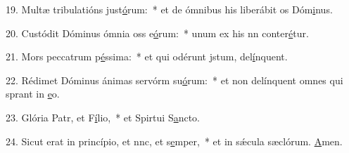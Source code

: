 19. Multæ tribulatións just\uline{ó}rum:~* et de ómnibus his liberábit os Dóm\uline{i}nus.\par 
20. Custódit Dóminus ómnia oss e\uline{ó}rum:~* unum ex his nn conter\uline{é}tur.\par 
21. Mors peccatrum p\uline{é}ssima:~* et qui odérunt jstum, del\uline{í}nquent.\par 
22. Rédimet Dóminus ánimas servórm su\uline{ó}rum:~* et non delínquent omnes qui sprant in \uline{e}o.\par 
23. Glória Patr, et F\uline{í}lio,~* et Spirtui S\uline{a}ncto.\par 
24. Sicut erat in princípio, et nnc, et s\uline{e}mper,~* et in sǽcula sæclórum. \uline{A}men.\par 

